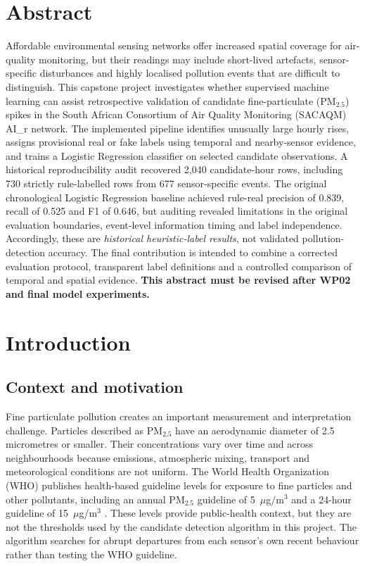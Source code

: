\documentclass[12pt,a4paper,oneside]{report}
\newcommand{\pmf}{PM$_{2.5}$}
\begin{document}
\chapter*{Abstract}
Affordable environmental sensing networks offer increased spatial coverage for air-quality monitoring, but their readings may include short-lived artefacts, sensor-specific disturbances and highly localised pollution events that are difficult to distinguish. This capstone project investigates whether supervised machine learning can assist retrospective validation of candidate fine-particulate (\pmf) spikes in the South African Consortium of Air Quality Monitoring (SACAQM) AI\_r network. The implemented pipeline identifies unusually large hourly rises, assigns provisional real or fake labels using temporal and nearby-sensor evidence, and trains a Logistic Regression classifier on selected candidate observations. A historical reproducibility audit recovered 2,040 candidate-hour rows, including 730 strictly rule-labelled rows from 677 sensor-specific events. The original chronological Logistic Regression baseline achieved rule-real precision of 0.839, recall of 0.525 and F1 of 0.646, but auditing revealed limitations in the original evaluation boundaries, event-level information timing and label independence. Accordingly, these are \emph{historical heuristic-label results}, not validated pollution-detection accuracy. The final contribution is intended to combine a corrected evaluation protocol, transparent label definitions and a controlled comparison of temporal and spatial evidence. \textbf{This abstract must be revised after WP02 and final model experiments.}
\tableofcontents
\listoffigures
\listoftables
\clearpage{}

\chapter{Introduction}
\section{Context and motivation}
Fine particulate pollution creates an important measurement and interpretation challenge. Particles described as \pmf{} have an aerodynamic diameter of 2.5 micrometres or smaller. Their concentrations vary over time and across neighbourhoods because emissions, atmospheric mixing, transport and meteorological conditions are not uniform. The World Health Organization (WHO) publishes health-based guideline levels for exposure to fine particles and other pollutants, including an annual \pmf{} guideline of 5~$\mu$g/m$^3$ and a 24-hour guideline of 15~$\mu$g/m$^3$ \citep{who2021}. These levels provide public-health context, but they are not the thresholds used by the candidate detection algorithm in this project. The algorithm searches for abrupt departures from each sensor's own recent behaviour rather than testing the WHO guideline.
\end{document}
